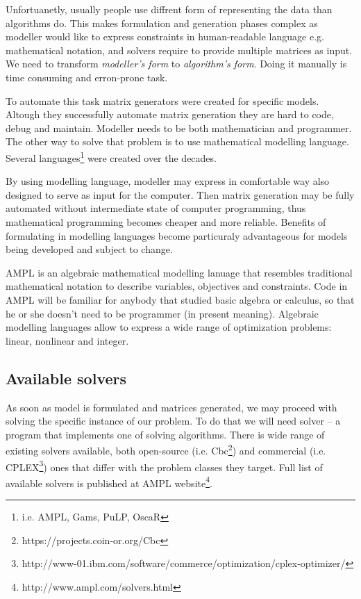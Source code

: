 Unfortuanetly, usually people use diffrent form of representing the data than algorithms do. This makes formulation and generation phases complex as modeller would like to express constraints in human-readable language e.g. mathematical notation, and solvers require to provide multiple matrices as input. We need to transform \emph{modeller's form} to \emph{algorithm's form}. Doing it manually is time consuming and erron-prone task.

To automate this task matrix generators were created for specific models. Altough they successfully automate matrix generation they are hard to code, debug and maintain. Modeller needs to be both mathematician and programmer. The other way to solve that problem is to use mathematical modelling language. Several languages\footnote{i.e. AMPL, Gams, PuLP, OscaR}  were created over the decades. 

By using modelling language, modeller may express in comfortable way also designed to serve as input for the computer. Then matrix generation may be fully automated without intermediate state of computer programming, thus mathematical programming becomes cheaper and more reliable. Benefits of formulating in modelling languages become particuraly advantageous for models being developed and subject to change.

AMPL is an algebraic mathematical modelling lanuage that resembles traditional mathematical notation to describe variables, objectives and constraints. Code in AMPL will be familiar for anybody that studied basic algebra or calculus, so that he or she doesn't need to be programmer (in present meaning). Algebraic modelling languages allow to express a wide range of optimization problems: linear, nonlinear and integer.

\subsection{Available solvers}

As soon as model is formulated and matrices generated, we may proceed with solving the specific instance of our problem. To do that we will need solver -- a program that implements one of solving algorithms. There is wide range of existing solvers available, both open-source (i.e. Cbc\footnote{https://projects.coin-or.org/Cbc}) and commercial (i.e. CPLEX\footnote{http://www-01.ibm.com/software/commerce/optimization/cplex-optimizer/}) ones that differ with the problem classes they target. Full list of available solvers is published at AMPL website\footnote{http://www.ampl.com/solvers.html}.

